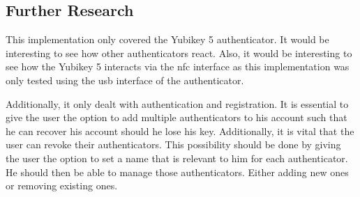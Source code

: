 \documentclass[a4paper, 11pt]{scrartcl}
\begin{document}
\subsection{Further Research}

This implementation only covered the Yubikey 5 authenticator. It would be interesting to see how other authenticators react. Also, it would be interesting to see how the Yubikey 5 interacts via the \gls{nfc} interface as this implementation was only tested using the \gls{usb} interface of the authenticator. 

Additionally, it only dealt with authentication and registration. It is essential to give the user the option to add multiple authenticators to his account such that he can recover his account should he lose his key. Additionally, it is vital that the user can revoke their authenticators. This possibility should be done by giving the user the option to set a name that is relevant to him for each authenticator. He should then be able to manage those authenticators. Either adding new ones or removing existing ones. 


\clearpage

\printglossaries

\clearpage

\printbibliography[heading=bibintoc]
\end{document}
